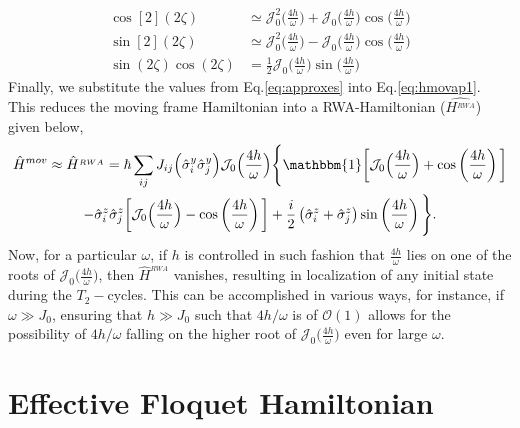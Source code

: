 \documentclass[12pt]{iopart}
\begin{document}
\begin{align}
	\cos[2](2\zeta) &\simeq \mathcal{J}^2_0\Big(\frac{4h}{\omega}\Big) +  \mathcal{J}_0\Big(\frac{4h}{\omega}\Big) \cos\Big(\frac{4h}{\omega}\Big)\nonumber\\
	\sin[2](2\zeta) &\simeq \mathcal{J}^2_0\Big(\frac{4h}{\omega}\Big) - \mathcal{J}_0\Big(\frac{4h}{\omega}\Big) \cos\Big(\frac{4h}{\omega}\Big) \nonumber\\
	\sin(2\zeta) \cos(2\zeta)&= \frac12 \mathcal{J}_0\Big(\frac{4h}{\omega}\Big)\sin\Big(\frac{4h}{\omega}\Big) 
	\label{eq:approxes}	
\end{align}
Finally, we substitute the values from Eq.\eqref{eq:approxes} into Eq.\eqref{eq:hmovap1}. This reduces the moving frame Hamiltonian into a RWA-Hamiltonian ($\hat{H^{_{RWA}}}$) given below,
\begin{multline}
    \hat{H}^{mov}\approx \hat{H}^{_{RWA}} = \hbar\sum_{ij} J_{ij} \Big(\hat{\sigma}^y_i\hat{\sigma}^y_j\Big) \mathcal{J}_0\Big(\frac{4h}{\omega}\Big)\Bigg\{\mathbbm{1}\bigg[\mathcal{J}_0\Big(\frac{4h}{\omega}\Big) + \cos\left(\frac{4h}{\omega}\right)\bigg] \\
    -\hat{\sigma}^z_i\hat{\sigma}^z_j \bigg[\mathcal{J}_0\Big(\frac{4h}{\omega}\Big) - \cos\left(\frac{4h}{\omega}\right)\bigg] + \frac{i}{2} \left(\hat{\sigma}^z_i + \hat{\sigma}^z_j\right) \sin\left(\frac{4h}{\omega}\right)\Bigg\}.
    \label{eq:hrwa}
\end{multline}	
Now, for a particular $\omega$, if $h$ is controlled in such fashion that $\frac{4h}{\omega}$ lies on one of the roots of $\mathcal{J}_0\Big(\frac{4h}{\omega}\Big)$, then $\hat{H}^{_{RWA}}$ vanishes, resulting in localization of any initial state during the $T_2-$cycles. This can be accomplished in various ways, for instance, if $\omega\gg J_0$, ensuring that $h\gg J_0$ such that $4h/\omega$ is of $\mathcal{O}(1)$ allows for the possibility of $4h/\omega$ falling on the higher root of $\mathcal{J}_0\Big(\frac{4h}{\omega}\Big)$ even for large $\omega$.

\section{\label{sec:AppendixB} Effective Floquet Hamiltonian}
\end{document}
